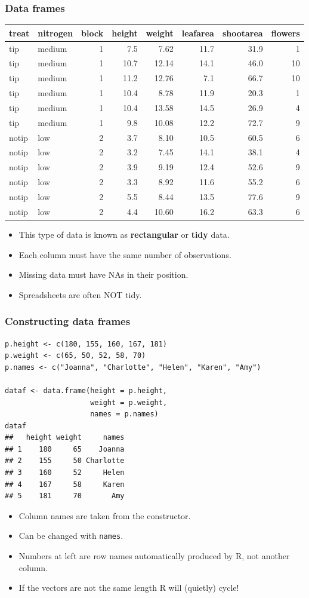 \documentclass{beamer}
\newcommand{\lst}[1]{\lstinline{#1}}
\newcommand{\bi}{\begin{itemize}}
\newcommand{\li}{\item}
\newcommand{\ei}{\end{itemize}}
\newcommand{\bfr}[1]{\begin{frame}[fragile]\frametitle{{ #1 }}}
\begin{document}
\bfr{Data frames}
{\scriptsize
\begin{tabular}{llrrrrrr}
treat&	nitrogen&	block&	height&	weight&	leafarea&	shootarea&	flowers\\\hline
tip&	medium&	1&	7.5&	7.62&	11.7&	31.9&	1\\
tip&	medium&	1&	10.7&	12.14&	14.1&	46.0&	10\\
tip&	medium&	1&	11.2&	12.76&	7.1&	66.7&	10\\
tip&	medium&	1&	10.4&	8.78&	11.9&	20.3&	1\\
tip&	medium&	1&	10.4&	13.58&	14.5&	26.9&	4\\
tip&	medium&	1&	9.8&	10.08&	12.2&	72.7&	9\\
notip&	low&	2&	3.7&	8.10&	10.5&	60.5&	6\\
notip&	low&	2&	3.2&	7.45&	14.1&	38.1&	4\\
notip&	low&	2&	3.9&	9.19&	12.4&	52.6&	9\\
notip&	low&	2&	3.3&	8.92&	11.6&	55.2&	6\\
notip&	low&	2&	5.5&	8.44&	13.5&	77.6&	9\\
notip&	low&	2&	4.4&	10.60&	16.2&	63.3&	6\\
\end{tabular}
}
\bi
\li This type of data is known as {\bf rectangular} or {\bf tidy} data.
\li Each column must have the same number of observations.
\li Missing data must have NAs in their position.
\li Spreadsheets are often NOT tidy.
\ei

\end{frame}

\bfr{Constructing data frames}
{
\scriptsize
\begin{verbatim}
p.height <- c(180, 155, 160, 167, 181)
p.weight <- c(65, 50, 52, 58, 70)
p.names <- c("Joanna", "Charlotte", "Helen", "Karen", "Amy")

dataf <- data.frame(height = p.height, 
                    weight = p.weight, 
                    names = p.names)
dataf
##   height weight     names
## 1    180     65    Joanna
## 2    155     50 Charlotte
## 3    160     52     Helen
## 4    167     58     Karen
## 5    181     70       Amy

\end{verbatim}
}
\bi
\li Column names are taken from the constructor.
\li Can be changed with \lst{names}.
\li Numbers at left are row names automatically produced by R, not another column.
\li If the vectors are not the same length R will (quietly) cycle!
\ei
\end{frame}
\end{document}
